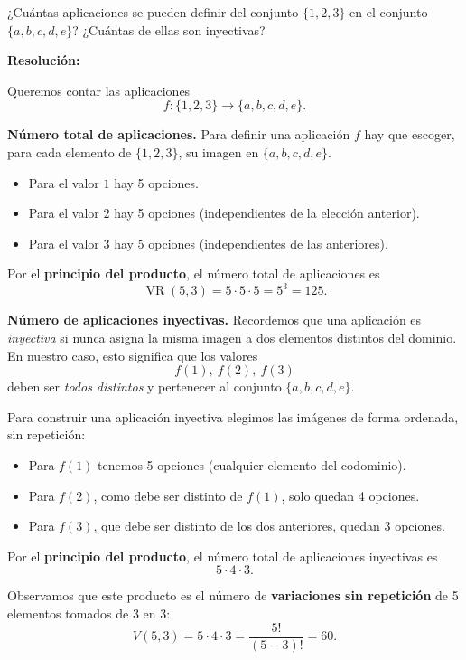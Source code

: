 \documentclass[a4paper,12pt]{article}
\begin{document}
\begin{ejercicio}[title=Ejercicio 19]
¿Cuántas aplicaciones se pueden definir del conjunto $\{1,2,3\}$ en el conjunto $\{a,b,c,d,e\}$? ¿Cuántas de ellas son inyectivas?

\tcblower
\textbf{Resolución:}

Queremos contar las aplicaciones
\[
f:\{1,2,3\}\longrightarrow\{a,b,c,d,e\}.
\]

\medskip
\textbf{Número total de aplicaciones.}  
Para definir una aplicación \(f\) hay que escoger, para cada elemento de \(\{1,2,3\}\), su imagen en \(\{a,b,c,d,e\}\).  

\begin{itemize}
\item Para el valor \(1\) hay 5 opciones.
\item Para el valor \(2\) hay 5 opciones (independientes de la elección anterior).
\item Para el valor \(3\) hay 5 opciones (independientes de las anteriores).
\end{itemize}

Por el \textbf{principio del producto}, el número total de aplicaciones es
\[
\operatorname{VR}(5,3) = 5\cdot 5\cdot 5 = 5^3 = \boxed{125}.
\]

\medskip
\textbf{Número de aplicaciones inyectivas.}  
Recordemos que una aplicación es \emph{inyectiva} si nunca asigna la misma imagen a dos elementos distintos del dominio.  
En nuestro caso, esto significa que los valores
\[
f(1),\ f(2),\ f(3)
\]
deben ser \emph{todos distintos} y pertenecer al conjunto \(\{a,b,c,d,e\}\).

Para construir una aplicación inyectiva elegimos las imágenes de forma ordenada, sin repetición:

\begin{itemize}
    \item Para \(f(1)\) tenemos 5 opciones (cualquier elemento del codominio).
    \item Para \(f(2)\), como debe ser distinto de \(f(1)\), solo quedan 4 opciones.
    \item Para \(f(3)\), que debe ser distinto de los dos anteriores, quedan 3 opciones.
\end{itemize}

Por el \textbf{principio del producto}, el número total de aplicaciones inyectivas es
\[
5 \cdot 4 \cdot 3.
\]

Observamos que este producto es el número de \textbf{variaciones sin repetición} de 5 elementos tomados de 3 en 3:
\[
V(5,3) = 5\cdot 4\cdot 3 = \frac{5!}{(5-3)!} = \boxed{60}.
\]

\end{ejercicio}
\end{document}
